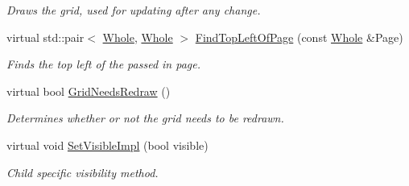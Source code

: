 \begin{DoxyCompactItemize}
\begin{DoxyCompactList}\small\item\em Draws the grid, used for updating after any change. \item\end{DoxyCompactList}\item 
\hypertarget{classMezzanine_1_1UI_1_1PagedCellGrid_a53f378817ddfbc318fa41b91b60995dc}{
virtual std::pair$<$ \hyperlink{namespaceMezzanine_adcbb6ce6d1eb4379d109e51171e2e493}{Whole}, \hyperlink{namespaceMezzanine_adcbb6ce6d1eb4379d109e51171e2e493}{Whole} $>$ \hyperlink{classMezzanine_1_1UI_1_1PagedCellGrid_a53f378817ddfbc318fa41b91b60995dc}{FindTopLeftOfPage} (const \hyperlink{namespaceMezzanine_adcbb6ce6d1eb4379d109e51171e2e493}{Whole} \&Page)}
\label{classMezzanine_1_1UI_1_1PagedCellGrid_a53f378817ddfbc318fa41b91b60995dc}

\begin{DoxyCompactList}\small\item\em Finds the top left of the passed in page. \item\end{DoxyCompactList}\item 
\hypertarget{classMezzanine_1_1UI_1_1PagedCellGrid_a0a7bc7804b428773c4337b437c71661a}{
virtual bool \hyperlink{classMezzanine_1_1UI_1_1PagedCellGrid_a0a7bc7804b428773c4337b437c71661a}{GridNeedsRedraw} ()}
\label{classMezzanine_1_1UI_1_1PagedCellGrid_a0a7bc7804b428773c4337b437c71661a}

\begin{DoxyCompactList}\small\item\em Determines whether or not the grid needs to be redrawn. \item\end{DoxyCompactList}\item 
\hypertarget{classMezzanine_1_1UI_1_1PagedCellGrid_a7a8a1e76b9c46a534ecc6d8458658431}{
virtual void \hyperlink{classMezzanine_1_1UI_1_1PagedCellGrid_a7a8a1e76b9c46a534ecc6d8458658431}{SetVisibleImpl} (bool visible)}
\label{classMezzanine_1_1UI_1_1PagedCellGrid_a7a8a1e76b9c46a534ecc6d8458658431}

\begin{DoxyCompactList}\small\item\em Child specific visibility method. \item\end{DoxyCompactList}\end{DoxyCompactItemize}
